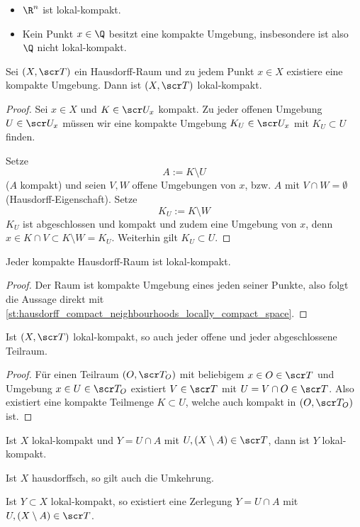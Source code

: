 \begin{ex}
	\begin{itemize}
		\item
			$\R^n$ ist lokal-kompakt.
		\item
			Kein Punkt $x\in \Q$ besitzt eine kompakte Umgebung, insbesondere ist also $\Q$ nicht lokal-kompakt.
	\end{itemize}
\end{ex}

\begin{st} \label{st:hausdorff_compact_neighbourhoods_locally_compact_space}
	Sei $(X, \scr T)$ ein Hausdorff-Raum und zu jedem Punkt $x \in X$ existiere eine kompakte Umgebung.
	Dann ist $(X, \scr T)$ lokal-kompakt.
	\begin{proof}
		Sei $x \in X$ und $K \in \scr U_x$ kompakt.
		Zu jeder offenen Umgebung $U \in \scr U_x$ müssen wir eine kompakte Umgebung $K_U \in \scr U_x$ mit $K_U \subset U$ finden.

		Setze
		\[
			A := K \setminus U
		\]
		($A$ kompakt) und seien $V, W$ offene Umgebungen von $x$, bzw. $A$ mit $V \cap W = \emptyset$ (Hausdorff-Eigenschaft).
		Setze
		\[
			K_U := K \setminus W
		\]
		$K_U$ ist abgeschlossen und kompakt und zudem eine Umgebung von $x$, denn $x \in K \cap V \subset K \setminus W = K_U$.
		Weiterhin gilt $K_U \subset U$.
	\end{proof}
\end{st}

\begin{kor}
	Jeder kompakte Hausdorff-Raum ist lokal-kompakt.
	\begin{proof}
		Der Raum ist kompakte Umgebung eines jeden seiner Punkte, also folgt die Aussage direkt mit \ref{st:hausdorff_compact_neighbourhoods_locally_compact_space}.
	\end{proof}
\end{kor}

\begin{lem}
	Ist $(X, \scr T)$ lokal-kompakt, so auch jeder offene und jeder abgeschlossene Teilraum.
	\begin{proof}
		Für einen Teilraum $(O, \scr T_O)$ mit beliebigem $x \in O \in \scr T$ und Umgebung $x \in U \in \scr T_O$ existiert $V \in \scr T$ mit $U = V \cap O \in \scr T$.
		Also existiert eine kompakte Teilmenge $K \subset U$, welche auch kompakt in $(O, \scr T_O)$ ist.
	\end{proof}
\end{lem}

\begin{st}
	Ist $X$ lokal-kompakt und $Y = U \cap A$ mit $U, (X \setminus A) \in \scr T$, dann ist $Y$ lokal-kompakt.

	Ist $X$ hausdorffsch, so gilt auch die Umkehrung.

	Ist $Y \subset X$ lokal-kompakt, so existiert eine Zerlegung $Y = U \cap A$ mit $U, (X \setminus A) \in \scr T$.
\end{st}

